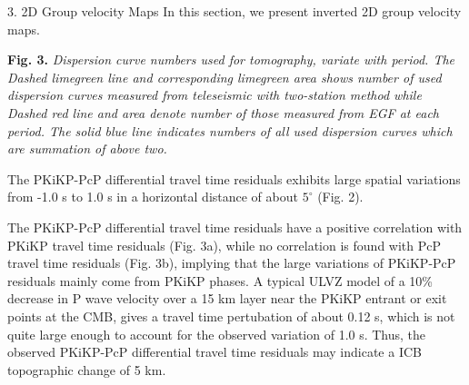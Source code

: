 \documentclass[
    landscape,      %
    paperwidth = 1200mm,
    paperheight = 900mm,
    fontscale = 0.34,
    margin = 1.7cm,
]{baposter}
\begin{document}
\begin{poster}
\begin{posterbox}[column=1]{3. 2D Group velocity Maps}
In this section, we present inverted 2D group velocity maps.
\begin{center}
\begin{minipage}{0.62\textwidth}
\end{minipage}
\begin{minipage}{0.35\textwidth}
\footnotesize
\textbf{Fig. 3.}
\itshape
Dispersion curve numbers used for tomography, variate with period. The Dashed
limegreen line and corresponding limegreen area shows number of used dispersion
curves measured from teleseismic with two-station method while Dashed
red line and area denote number of those measured from EGF at each period. The
solid blue line indicates numbers of all used dispersion curves which are summation of
above two.
\end{minipage}
\end{center}

The PKiKP-PcP differential travel time residuals exhibits
large spatial variations from -1.0 s to 1.0 s in a horizontal distance of
about $5^\circ$ (Fig. 2).




The PKiKP-PcP differential travel time residuals have a positive correlation
with PKiKP travel time residuals (Fig. 3a), while no correlation is found with PcP
travel time residuals (Fig. 3b), implying that the large variations of PKiKP-PcP
residuals mainly come from PKiKP phases. A typical ULVZ model of a 10\%
decrease in P wave velocity over a 15 km layer near the PKiKP entrant or
exit points at the CMB, gives a travel time pertubation of about 0.12 s,
which is not quite large enough to account for the observed variation of 1.0 s.
Thus, the observed PKiKP-PcP differential travel time residuals may indicate
a ICB topographic change of 5 km.


\end{posterbox}
\end{poster}
\end{document}

